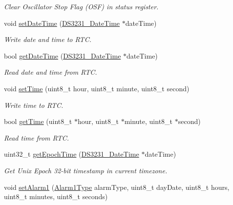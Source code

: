 \begin{DoxyCompactItemize}
\begin{DoxyCompactList}\small\item\em Clear Oscillator Stop Flag (O\+SF) in status register. \end{DoxyCompactList}\item 
void \hyperlink{class_d_s3231_aef50339f978d9fbe4cdd42e38c26fc0c}{set\+Date\+Time} (\hyperlink{_d_s3231_8h_a79a5c1f4b249b6f512ca108013374536}{D\+S3231\+\_\+\+Date\+Time} $\ast$date\+Time)
\begin{DoxyCompactList}\small\item\em Write date and time to R\+TC. \end{DoxyCompactList}\item 
bool \hyperlink{class_d_s3231_a5c627e2a9a7b7c9c99723b6c0916889f}{get\+Date\+Time} (\hyperlink{_d_s3231_8h_a79a5c1f4b249b6f512ca108013374536}{D\+S3231\+\_\+\+Date\+Time} $\ast$date\+Time)
\begin{DoxyCompactList}\small\item\em Read date and time from R\+TC. \end{DoxyCompactList}\item 
void \hyperlink{class_d_s3231_a03ff0537cadf522c98801d42fe55bb08}{set\+Time} (uint8\+\_\+t hour, uint8\+\_\+t minute, uint8\+\_\+t second)
\begin{DoxyCompactList}\small\item\em Write time to R\+TC. \end{DoxyCompactList}\item 
bool \hyperlink{class_d_s3231_ac4b80a2bcda996f2629b2197688d79bc}{get\+Time} (uint8\+\_\+t $\ast$hour, uint8\+\_\+t $\ast$minute, uint8\+\_\+t $\ast$second)
\begin{DoxyCompactList}\small\item\em Read time from R\+TC. \end{DoxyCompactList}\item 
uint32\+\_\+t \hyperlink{class_d_s3231_af0e5a643bf64755c12e40f8cf293035b}{get\+Epoch\+Time} (\hyperlink{_d_s3231_8h_a79a5c1f4b249b6f512ca108013374536}{D\+S3231\+\_\+\+Date\+Time} $\ast$date\+Time)
\begin{DoxyCompactList}\small\item\em Get Unix Epoch 32-\/bit timestamp in current timezone. \end{DoxyCompactList}\item 
void \hyperlink{class_d_s3231_a3386f9c527b7e94ef20338af45b9ba24}{set\+Alarm1} (\hyperlink{_d_s3231_8h_aa29471da8f6d22930cc9159a55a49273}{Alarm1\+Type} alarm\+Type, uint8\+\_\+t day\+Date, uint8\+\_\+t hours, uint8\+\_\+t minutes, uint8\+\_\+t seconds)

\end{DoxyCompactItemize}
